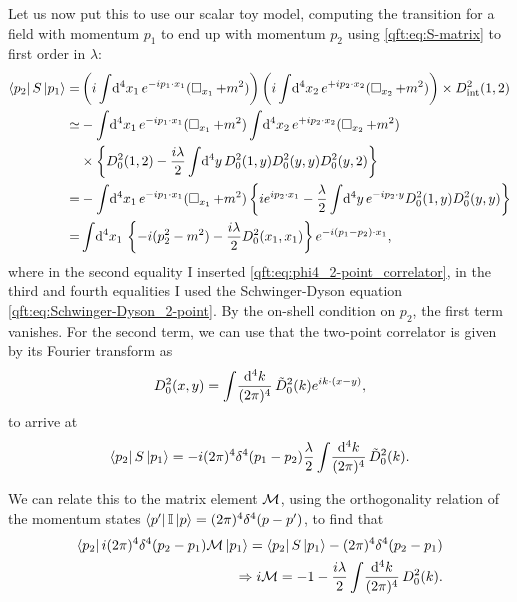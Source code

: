\documentclass[../main.tex]{subfiles}
\begin{document}
Let us now put this to use our scalar toy model, computing the transition for a field with momentum \(p_1\) to end up with momentum \(p_2\) using \cref{qft:eq:S-matrix} to first order in \(\lambda\):
\begin{align}
  \nonumber
  \bra{p_2} S \ket{p_1} = & \pclosed{i\integral{^4x_1} \exp{-ip_1 \cdot x_1} (\dA_{x_1} + m^2)} \pclosed{ i \integral{^4x_2} \exp{+ip_2 \cdot x_2} (\dA_{x_2} + m^2)} \times D_{\text{int}}^2(1, 2) \\
  \nonumber
  \simeq                  & -\integral{^4x_1} \exp{-ip_1 \cdot x_1} (\dA_{x_1} + m^2) \integral{^4x_2} \exp{+ip_2 \cdot x_2} (\dA_{x_2} + m^2)                                                      \\
  \nonumber
                          & \times \cclosed{D_0^2(1,2) - \frac{i\lambda}{2} \integral{^4y} D_0^2(1,y)D_0^2(y,y) D_0^2(y,2)}                                                                         \\
  \nonumber
  =                       & -\integral{^4x_1} \exp{-ip_1 \cdot x_1} (\dA_{x_1} + m^2) \cclosed{i \exp{ip_2\cdot x_1} - \frac{\lambda}{2}\integral{^4y} \exp{-ip_2\cdot y} D_0^2(1,y) D_0^2(y,y)}    \\
  =                       & \integral{^4x_1} \cclosed{-i (p^2_2 - m^2)- \frac{i\lambda}{2} D_0^2(x_1,x_1)} \exp{-i(p_1-p_2) \cdot x_1},
\end{align}
where in the second equality I inserted \cref{qft:eq:phi4_2-point_correlator}, in the third and fourth equalities I used the Schwinger-Dyson equation \cref{qft:eq:Schwinger-Dyson_2-point}.
By the on-shell condition on \(p_2\), the first term vanishes.
For the second term, we can use that the two-point correlator is given by its Fourier transform as
\begin{equation}
  D_0^2(x,y) = \int\!\frac{\mathrm{d}^{4}k}{(2\pi)^{4}}\, \tilde{D}_0^2(k) e^{ik\cdot(x-y)},
\end{equation}
to arrive at
\begin{equation}
  \left\langle p_2 \right| S \left| p_1 \right\rangle = -i(2\pi)^4 \delta^4(p_1 - p_2) \frac{\lambda}{2} \int\!\frac{\mathrm{d}^{4}k}{(2\pi)^{4}}\, \tilde{D}_0^2(k).
\end{equation}

We can relate this to the matrix element \(\mathcal{M}\), using the orthogonality relation of the momentum states \(\left\langle p^\prime \right| \operatorname{\mathbb{I}} \left| p \right\rangle = (2\pi)^4 \delta^4(p-p^\prime)\), to find that
\begin{align}
  \nonumber
  \left\langle p_2 \right| i(2\pi)^4 \delta^4(p_2-p_1) \mathcal{M} \left| p_1 \right\rangle = \left\langle p_2 \right| S \left| p_1 \right\rangle - (2\pi)^4 \delta^4(p_2-p_1) \\
  \Rightarrow i\mathcal{M} = -1 - \frac{i \lambda}{2} \int\!\frac{\mathrm{d}^{4}k}{(2\pi)^{4}}\, D_0^2(k).
\end{align}
\end{document}
